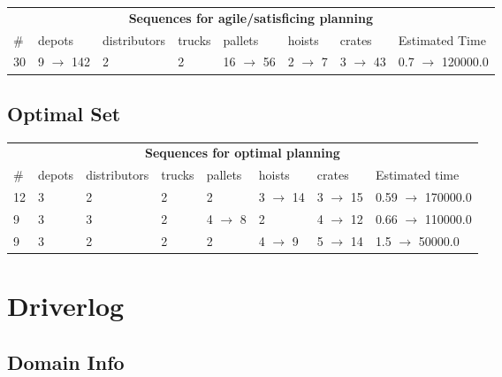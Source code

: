 \documentclass{article}
\begin{document}
                        \begin{center}
                        \begin{tabular}{l|l|l|l|l|l|l|l}
                        \multicolumn{8}{c}{\bf \large Sequences for agile/satisficing planning}\\
                        \# & depots & distributors & trucks & pallets & hoists & crates & Estimated Time\\\midrule
                        30&9 $\rightarrow$ 142&2&2&16 $\rightarrow$ 56&2 $\rightarrow$ 7&3 $\rightarrow$ 43&0.7 $\rightarrow$ 120000.0
                        \end{tabular}
                        \end{center}
                    
                            \subsection*{Optimal Set}

                            \begin{center}
                            \begin{tabular}{l|l|l|l|l|l|l|l}
                            \multicolumn{8}{c}{\bf \large Sequences for optimal planning}\\
                            \# & depots & distributors & trucks & pallets & hoists & crates & Estimated time\\\midrule
                            12&3&2&2&2&3 $\rightarrow$ 14&3 $\rightarrow$ 15&0.59 $\rightarrow$ 170000.0\\
9&3&3&2&4 $\rightarrow$ 8&2&4 $\rightarrow$ 12&0.66 $\rightarrow$ 110000.0\\
9&3&2&2&2&4 $\rightarrow$ 9&5 $\rightarrow$ 14&1.5 $\rightarrow$ 50000.0
                            \end{tabular}
                            \end{center}
                    \newpage \section{Driverlog}
                    \subsection*{Domain Info}
\end{document}

